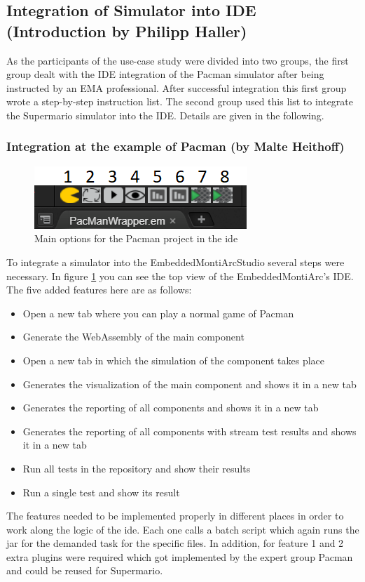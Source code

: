 \subsection{Integration of Simulator into IDE (Introduction by Philipp Haller)}

As the participants of the use-case study were divided into two groups, the first group dealt with the IDE integration of the Pacman simulator after being instructed by an EMA professional.
After successful integration this first group wrote a step-by-step instruction list. The second group used this list to integrate the Supermario simulator into the IDE. Details are given in the following.

\subsubsection{Integration at the example of Pacman (by Malte Heithoff)}
\begin{figure}
	\caption{Main options for the Pacman project in the ide}
	\label{fig:idePacmanTop}
	\centering
	\includegraphics[scale=0.55]{pictures/IDE/IDETop.png}
\end{figure}
To integrate a simulator into the EmbeddedMontiArcStudio several steps were necessary. In figure \ref{fig:idePacmanTop} you can see the top view of the EmbeddedMontiArc's IDE. The five added features here are as follows:
\begin{itemize}
	\item[1.] Open a new tab where you can play a normal game of Pacman
	\item[2.] Generate the WebAssembly of the main component
	\item[3.] Open a new tab in which the simulation of the component takes place
	\item[4.] Generates the visualization of the main component and shows it in a new tab
	\item[5.] Generates the reporting of all components and shows it in a new tab
	\item[6.] Generates the reporting of all components with stream test results and shows it in a new tab
	\item[7.] Run all tests in the repository and show their results
	\item[8.] Run a single test and show its result
\end{itemize}
The features needed to be implemented properly in different places in order to work along the logic of the ide. Each one calls a batch script which again runs the jar for the demanded task for the specific files. In addition, for feature 1 and 2 extra plugins were required which got implemented by the expert group Pacman and could be reused for Supermario.